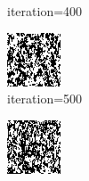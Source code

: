 \documentclass{article}
\begin{document}
\begin{figure}[h]
\begin{subfigure}[t]{0.18\textwidth}
\vspace{-0.6cm}
\caption{iteration=400}
\end{subfigure}\hspace{0.01\textwidth}
\begin{subfigure}[t]{0.18\textwidth}
\centering
\includegraphics[width=\textwidth]{./computational/results/gibbs_comb_sampler_positive_iter_500.png}
\vspace{-0.6cm}
\caption{iteration=500}
\end{subfigure}\hspace{0.01\textwidth}
\begin{subfigure}[t]{0.18\textwidth}
\centering
\includegraphics[width=\textwidth]{./computational/results/gibbs_comb_sampler_positive_iter_600.png}

\end{subfigure}
\end{figure}
\end{document}
